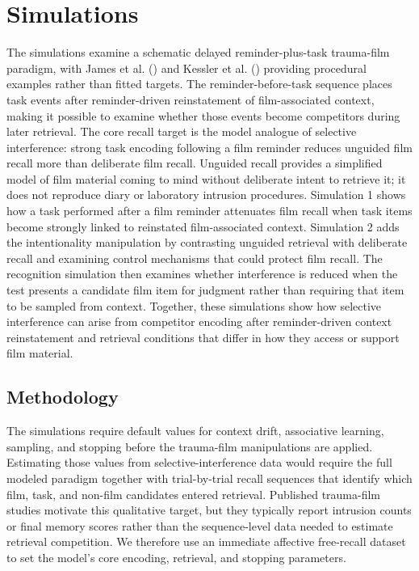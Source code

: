 \documentclass[
  man,
  floatsintext,
  longtable,
  nolmodern,
  notxfonts,
  notimes,
  draftfirst,
  colorlinks=true,linkcolor=blue,citecolor=blue,urlcolor=blue]{apa7}
\begin{document}
\section{Simulations}\label{simulations}

The simulations examine a schematic delayed reminder-plus-task
trauma-film paradigm, with James et al.
() and Kessler et al.
() providing procedural
examples rather than fitted targets. The reminder-before-task sequence
places task events after reminder-driven reinstatement of
film-associated context, making it possible to examine whether those
events become competitors during later retrieval. The core recall target
is the model analogue of selective interference: strong task encoding
following a film reminder reduces unguided film recall more than
deliberate film recall. Unguided recall provides a simplified model of
film material coming to mind without deliberate intent to retrieve it;
it does not reproduce diary or laboratory intrusion procedures.
Simulation 1 shows how a task performed after a film reminder attenuates
film recall when task items become strongly linked to reinstated
film-associated context. Simulation 2 adds the intentionality
manipulation by contrasting unguided retrieval with deliberate recall
and examining control mechanisms that could protect film recall. The
recognition simulation then examines whether interference is reduced
when the test presents a candidate film item for judgment rather than
requiring that item to be sampled from context. Together, these
simulations show how selective interference can arise from competitor
encoding after reminder-driven context reinstatement and retrieval
conditions that differ in how they access or support film material.

\subsection{Methodology}\label{methodology}

The simulations require default values for context drift, associative
learning, sampling, and stopping before the trauma-film manipulations
are applied. Estimating those values from selective-interference data
would require the full modeled paradigm together with trial-by-trial
recall sequences that identify which film, task, and non-film candidates
entered retrieval. Published trauma-film studies motivate this
qualitative target, but they typically report intrusion counts or final
memory scores rather than the sequence-level data needed to estimate
retrieval competition. We therefore use an immediate affective
free-recall dataset to set the model's core encoding, retrieval, and
stopping parameters.
\end{document}

